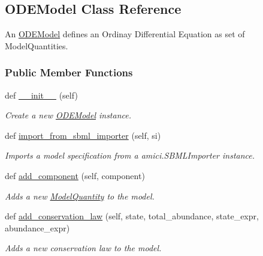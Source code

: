 \hypertarget{classamici_1_1ode__export_1_1_o_d_e_model}{}\subsection{O\+D\+E\+Model Class Reference}
\label{classamici_1_1ode__export_1_1_o_d_e_model}


An \mbox{\hyperlink{classamici_1_1ode__export_1_1_o_d_e_model}{O\+D\+E\+Model}} defines an Ordinay Differential Equation as set of Model\+Quantities.  


\subsubsection*{Public Member Functions}
\begin{DoxyCompactItemize}
\item 
def \mbox{\hyperlink{classamici_1_1ode__export_1_1_o_d_e_model_ae64f0875afe3067b97ba370b354b9213}{\+\_\+\+\_\+init\+\_\+\+\_\+}} (self)
\begin{DoxyCompactList}\small\item\em Create a new \mbox{\hyperlink{classamici_1_1ode__export_1_1_o_d_e_model}{O\+D\+E\+Model}} instance. \end{DoxyCompactList}\item 
def \mbox{\hyperlink{classamici_1_1ode__export_1_1_o_d_e_model_a3a3ebfdaf0d1f08adf028afb10d5b5c1}{import\+\_\+from\+\_\+sbml\+\_\+importer}} (self, si)
\begin{DoxyCompactList}\small\item\em Imports a model specification from a amici.\+S\+B\+M\+L\+Importer instance. \end{DoxyCompactList}\item 
def \mbox{\hyperlink{classamici_1_1ode__export_1_1_o_d_e_model_a2731bd07d8e64b54d6b455d6d8441f13}{add\+\_\+component}} (self, component)
\begin{DoxyCompactList}\small\item\em Adds a new \mbox{\hyperlink{classamici_1_1ode__export_1_1_model_quantity}{Model\+Quantity}} to the model. \end{DoxyCompactList}\item 
def \mbox{\hyperlink{classamici_1_1ode__export_1_1_o_d_e_model_a0141f61903c375ed6867932c570f7e4f}{add\+\_\+conservation\+\_\+law}} (self, state, total\+\_\+abundance, state\+\_\+expr, abundance\+\_\+expr)
\begin{DoxyCompactList}\small\item\em Adds a new conservation law to the model. \end{DoxyCompactList}\item 

\end{DoxyCompactItemize}
